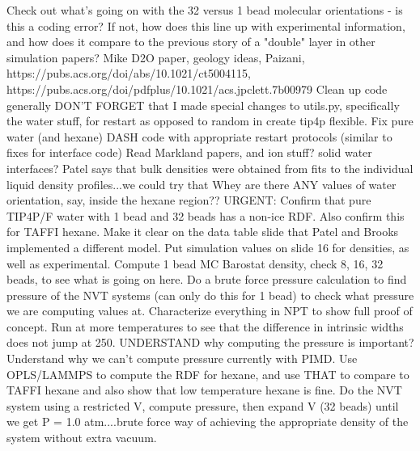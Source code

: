 \documentclass[12pt,reqno]{amsart}
\numberwithin{equation}{section}
\begin{document}
\begin{enumerate}
\subitem Check out what's going on with the 32 versus 1 bead molecular orientations - is this a coding error?  If not, how does this line up with experimental information, and how does it compare to the previous story of a "double" layer in other simulation papers?  
\subitem Mike D2O paper, geology ideas, Paizani, https://pubs.acs.org/doi/abs/10.1021/ct5004115, https://pubs.acs.org/doi/pdfplus/10.1021/acs.jpclett.7b00979
\subitem Clean up code generally 
\subitem DON'T FORGET that I made special changes to utils.py, specifically the water stuff, for restart as opposed to random in create tip4p flexible.  
\subitem Fix pure water (and hexane) DASH code with appropriate restart protocols (similar to fixes for interface code)
\subitem Read Markland papers, and ion stuff?  solid water interfaces?
\subitem Patel says that bulk densities were obtained from fits to the individual liquid density profiles...we could try that
\subitem Whey are there ANY values of water orientation, say, inside the hexane region??
\subitem URGENT: Confirm that pure TIP4P/F water with 1 bead and 32 beads has a non-ice RDF.  Also confirm this for TAFFI hexane.  Make it clear on the data table slide that Patel and Brooks implemented a different model.  Put simulation values on slide 16 for densities, as well as experimental.  Compute 1 bead MC Barostat density, check 8, 16, 32 beads, to see what is going on here.  Do a brute force pressure calculation to find pressure of the NVT systems (can only do this for 1 bead) to check what pressure we are computing values at.  Characterize everything in NPT to show full proof of concept.  Run at more temperatures to see that the difference in intrinsic widths does not jump at 250.  UNDERSTAND why computing the pressure is important?  Understand why we can't compute pressure currently with PIMD.  Use OPLS/LAMMPS to compute the RDF for hexane, and use THAT to compare to TAFFI hexane and also show that low temperature hexane is fine.  Do the NVT system using a restricted V, compute pressure, then expand V (32 beads) until we get P = 1.0 atm....brute force way of achieving the appropriate density of the system without extra vacuum.  


\end{enumerate}
\end{document}
